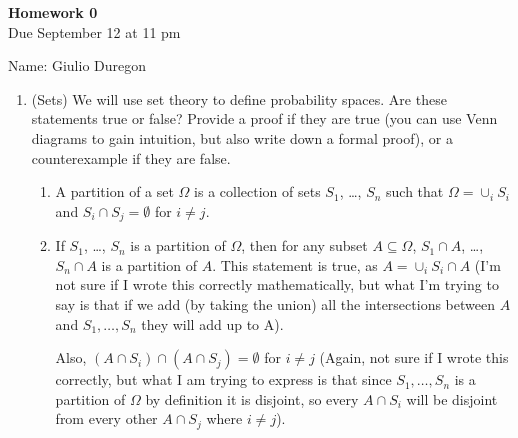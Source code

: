 \documentclass[12pt,twoside]{article}
\begin{document}
\begin{center}
{\large{\textbf{Homework 0}} } \vspace{0.2cm}\\
Due September 12 at 11 pm
\\
\end{center}
Name: Giulio Duregon

\begin{enumerate}

\item (Sets) We will use set theory to define probability spaces. Are these statements true or false? Provide a proof if they are true (you can use Venn diagrams to gain intuition, but also write down a formal proof), or a counterexample if they are false. 
\begin{enumerate}
\item[] A partition of a set $\Omega$ is a collection of sets $S_1$, \ldots, $S_n$ such that $\Omega = \cup_{i}S_i$ and $S_i \cap S_j = \emptyset$ for $i\neq j$. 
\item If  $S_1$, \ldots, $S_n$ is a partition of $\Omega$, then for any subset $A \subseteq \Omega$, $S_1 \cap A$, \ldots, $S_n \cap A$ is a partition of $A$.
\subitem
This statement is true, as $A = \cup_{i}S_i \cap A$ (I'm not sure if I wrote this correctly mathematically, but what I'm trying to say is that if we add (by taking the union) all the intersections between $A$ and $S_1, \dots, S_n$ they will add up to A).\par
Also,  $(A \cap S_i) \cap (A \cap S_j) = \emptyset$ for $i\neq j$ (Again, not sure if I wrote this correctly, but what I am trying to express is that since $S_1, \dots, S_n$ is a partition of $\Omega$ by definition it is disjoint, so every $A\cap S_i$ will be disjoint from every other $A\cap S_j$ where $i\neq j$).


\end{enumerate}
\end{enumerate}
\end{document}
